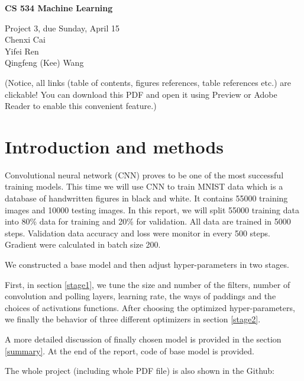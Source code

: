 \documentclass[11pt]{article}
\begin{document}
\begin{center}
  {\bf
  CS 534 Machine Learning  }

\vspace{12pt}

  Project 3, due Sunday, April 15
  \\
  Chenxi Cai \\
  Yifei Ren \\
  Qingfeng (Kee) Wang
 
\end{center}

\vspace{12pt}




\clearpage
(Notice, all links (table of contents, figures references, table references etc.) are clickable! You can download this PDF and open it using Preview or Adobe Reader to enable this convenient feature.)
 
\tableofcontents{}

\clearpage


\section{Introduction and methods}
Convolutional neural network (CNN) proves to be one of the most successful training models. This time we will use CNN to train MNIST data which is a database of handwritten figures in black and white. It contains 55000 training images and 10000 testing images. In this report, we will split 55000 training data into 80\% data for training and 20\% for validation. All data are trained in 5000 steps. Validation data accuracy and loss were monitor in every 500 steps. Gradient were calculated in batch size 200.


We constructed a base model and then adjust  hyper-parameters in two stages. 

First, in section \ref{stage1}, we tune the size and number of the filters, number of convolution and polling layers, learning rate, the ways of paddings and the choices of activations functions. After choosing the optimized hyper-parameters, we finally the behavior of three different optimizers in section \ref{stage2}. 

A more detailed discussion of finally chosen model is provided in the section \ref{summary}. At the end of the report, code of base model is provided.

The whole project (including whole PDF file) is also shown in the Github:\\
\end{document}
